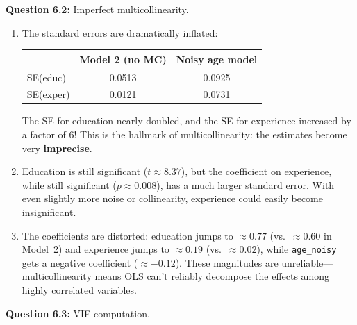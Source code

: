 \documentclass[11pt,letterpaper]{article}
\begin{document}
\textbf{Question 6.2:} Imperfect multicollinearity.

\begin{answer}
\begin{enumerate}[label=(\alph*)]
\item The standard errors are dramatically inflated:
\begin{center}
\begin{tabular}{l|cc}
\toprule
 & Model 2 (no MC) & Noisy age model \\
\midrule
SE(educ) & 0.0513 & 0.0925 \\
SE(exper) & 0.0121 & 0.0731 \\
\bottomrule
\end{tabular}
\end{center}
The SE for education nearly doubled, and the SE for experience increased by a factor of 6! This is the hallmark of multicollinearity: the estimates become very \textbf{imprecise}.

\item Education is still significant ($t \approx 8.37$), but the coefficient on experience, while still significant ($p \approx 0.008$), has a much larger standard error. With even slightly more noise or collinearity, experience could easily become insignificant.

\item The coefficients are distorted: education jumps to $\approx 0.77$ (vs.\ $\approx 0.60$ in Model~2) and experience jumps to $\approx 0.19$ (vs.\ $\approx 0.02$), while \texttt{age\_noisy} gets a negative coefficient ($\approx -0.12$). These magnitudes are unreliable---multicollinearity means OLS can't reliably decompose the effects among highly correlated variables.
\end{enumerate}
\end{answer}

\textbf{Question 6.3:} VIF computation.
\end{document}
